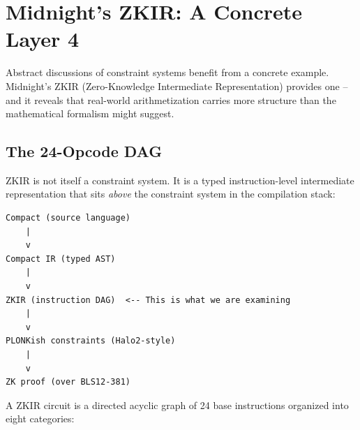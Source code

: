 \documentclass[
  11pt,
  openany]{report}
\begin{document}
\section{Midnight's ZKIR: A Concrete Layer
4}\label{midnights-zkir-a-concrete-layer-4}

Abstract discussions of constraint systems benefit from a concrete example.
Midnight's ZKIR (Zero-Knowledge Intermediate Representation) provides one -- and
it reveals that real-world arithmetization carries more structure than the
mathematical formalism might suggest.

\subsection{The 24-Opcode DAG}\label{the-24-opcode-dag}

ZKIR is not itself a constraint system. It is a typed instruction-level
intermediate representation that sits \emph{above} the constraint system in the
compilation stack:

\begin{verbatim}
Compact (source language)
    |
    v
Compact IR (typed AST)
    |
    v
ZKIR (instruction DAG)  <-- This is what we are examining
    |
    v
PLONKish constraints (Halo2-style)
    |
    v
ZK proof (over BLS12-381)
\end{verbatim}

A ZKIR circuit is a directed acyclic graph of 24 base instructions organized
into eight categories:
\end{document}
